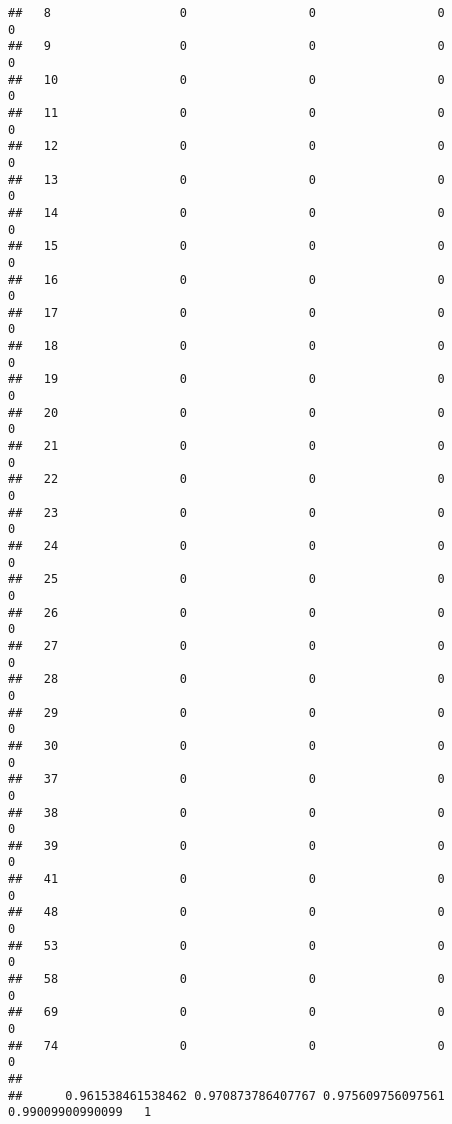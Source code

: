 \documentclass[]{article}
\begin{document}
\begin{verbatim}
##   8                  0                 0                 0                 0
##   9                  0                 0                 0                 0
##   10                 0                 0                 0                 0
##   11                 0                 0                 0                 0
##   12                 0                 0                 0                 0
##   13                 0                 0                 0                 0
##   14                 0                 0                 0                 0
##   15                 0                 0                 0                 0
##   16                 0                 0                 0                 0
##   17                 0                 0                 0                 0
##   18                 0                 0                 0                 0
##   19                 0                 0                 0                 0
##   20                 0                 0                 0                 0
##   21                 0                 0                 0                 0
##   22                 0                 0                 0                 0
##   23                 0                 0                 0                 0
##   24                 0                 0                 0                 0
##   25                 0                 0                 0                 0
##   26                 0                 0                 0                 0
##   27                 0                 0                 0                 0
##   28                 0                 0                 0                 0
##   29                 0                 0                 0                 0
##   30                 0                 0                 0                 0
##   37                 0                 0                 0                 0
##   38                 0                 0                 0                 0
##   39                 0                 0                 0                 0
##   41                 0                 0                 0                 0
##   48                 0                 0                 0                 0
##   53                 0                 0                 0                 0
##   58                 0                 0                 0                 0
##   69                 0                 0                 0                 0
##   74                 0                 0                 0                 0
##     
##      0.961538461538462 0.970873786407767 0.975609756097561 0.99009900990099   1

\end{verbatim}
\end{document}
